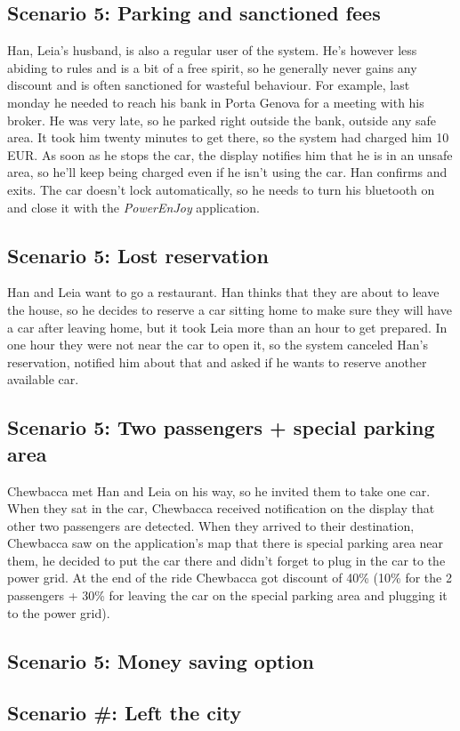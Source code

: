 \subsection{Scenario 5: Parking and sanctioned fees}
	Han, Leia's husband, is also a regular user of the system. He's however less abiding to rules and is a bit of a free spirit, so he generally never gains any discount and is often sanctioned for wasteful behaviour. For example, last monday he needed to reach his bank in Porta Genova for a meeting with his broker. He was very late, so he parked right outside the bank, outside any safe area. It took him twenty minutes to get there, so the system had charged him 10 EUR. As soon as he stops the car, the display notifies him that he is in an unsafe area, so he'll keep being charged even if he isn't using the car. Han confirms and exits. The car doesn't lock automatically, so he needs to turn his bluetooth on and close it with the \textit{PowerEnJoy} application. 

\subsection{Scenario 5: Lost reservation}
	Han and Leia want to go a restaurant. Han thinks that they are about to leave the house, so he decides to reserve a car sitting home to make sure they will have a car after leaving home, but it took Leia more than an hour to get prepared. In one hour they were not near the car to open it, so the system canceled Han's reservation, notified him about that and asked if he wants to reserve another available car.    	
	
\subsection{Scenario 5: Two passengers + special parking area}
	Chewbacca met Han and Leia on his way, so he invited them to take one car. When they sat in the car, Chewbacca received notification on the display that other two passengers are detected. When they arrived to their destination, Chewbacca saw on the application's map that there is special parking area near them, he decided to put the car there and didn't forget to plug in the car to the power grid. At the end of the ride Chewbacca got discount of 40\% (10\% for the 2 passengers + 30\% for leaving the car on the special parking area and plugging it to the power grid).  
	
\subsection{Scenario 5: Money saving option}

\subsection{Scenario #: Left the city}	
	
